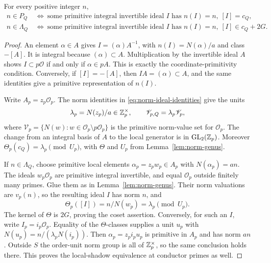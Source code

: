 \begin{lemma}\label{lem:form-ideal-shadow}
For every positive integer \(n\),
\begin{align*}
 n\in P_Q
 &\ \Longleftrightarrow\
 \text{some primitive integral invertible ideal }I
       \text{ has }n(I)=n,\ [I]=c_Q,\\
 n\in\Lambda_Q
 &\ \Longleftrightarrow\
 \text{some primitive integral invertible ideal }I
       \text{ has }n(I)=n,\ [I]\in c_Q+2G.
\end{align*}
\end{lemma}
\begin{proof}
An element \(\alpha\in A\) gives \(I=(\alpha)A^{-1}\), with
\(n(I)=N(\alpha)/a\) and class \(-[A]\). It is integral because
\((\alpha)\subset A\). Multiplication by the invertible ideal \(A\)
shows \(I\subset p\mathcal O\) if and only if \(\alpha\in pA\).
This is exactly the coordinate-primitivity condition. Conversely,
if \([I]=-[A]\), then \(IA=(\alpha)\subset A\), and the same
identities give a primitive representation of \(n(I)\).

Write \(A_p=z_p\mathcal O_p\). The norm identities in
\eqref{eq:norm-ideal-identities} give the units
\[
 \lambda_p=N(z_p)/a\in\mathbb Z_p^\times,\qquad
 \mathscr V_{p,Q}=\lambda_p\mathscr V_p,
\]
where
\(\mathscr V_p=\{N(w):w\in\mathcal O_p\setminus p\mathcal O_p\}\)
is the primitive norm-value set for \(\mathcal O_p\). The change from
an integral basis of \(A\) to the local generator is in \(\operatorname{GL}_2(\mathbb Z_p)\).
Moreover \(\Theta_p(c_Q)=\lambda_p\pmod{U_p}\), with \(\Theta\)
and \(U_p\) from Lemma~\ref{lem:norm-genus}.

If \(n\in\Lambda_Q\), choose primitive local elements
\(\alpha_p=z_pw_p\in A_p\) with \(N(\alpha_p)=an\).
The ideals \(w_p\mathcal O_p\) are primitive integral invertible,
and equal \(\mathcal O_p\) outside finitely many primes. Glue them
as in Lemma~\ref{lem:norm-genus}. Their norm valuations are
\(v_p(n)\), so the resulting ideal \(I\) has norm \(n\), and
\[
 \Theta_p([I])=n/N(w_p)=\lambda_p\pmod{U_p}.
\]
The kernel of \(\Theta\) is \(2G\), proving the coset assertion.
Conversely, for such an \(I\), write \(I_p=i_p\mathcal O_p\).
Equality of the \(\Theta\)-classes supplies a unit \(u_p\) with
\(N(u_p)=n/(\lambda_pN(i_p))\). Then
\(\alpha_p=z_pi_pu_p\) is primitive in \(A_p\) and has norm
\(an\). Outside \(S\) the order-unit norm group is all of
\(\mathbb Z_p^\times\), so the same conclusion holds there.
This proves the local-shadow equivalence at conductor primes as well.
\end{proof}

